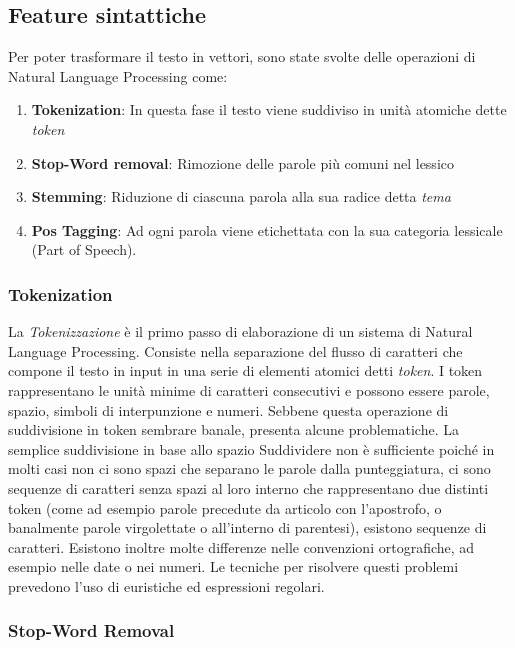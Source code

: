 \subsection{Feature sintattiche}
Per poter trasformare il testo in vettori, sono state svolte delle operazioni di Natural Language Processing come:
\begin{enumerate}
\item \textbf{Tokenization}: In questa fase il testo viene suddiviso in unità atomiche dette \emph{token}
\item \textbf{Stop-Word removal}: Rimozione delle parole più comuni nel lessico
\item \textbf{Stemming}: Riduzione di ciascuna parola alla sua radice detta \emph{tema}
\item \textbf{Pos Tagging}: Ad ogni parola viene etichettata con la sua categoria lessicale (Part of Speech).
\end{enumerate}
\subsubsection{Tokenization}

La \emph{Tokenizzazione} è il primo passo di elaborazione di un sistema di Natural Language
Processing. Consiste nella separazione del flusso di caratteri che compone il testo
in input in una serie di elementi atomici detti \emph{token}. I token rappresentano le
unità minime di caratteri consecutivi e possono essere parole, spazio, simboli di
interpunzione e numeri. Sebbene questa operazione di suddivisione in token 
sembrare banale, presenta alcune problematiche. La semplice suddivisione in base allo spazio Suddividere non è sufficiente poiché in molti casi non
ci sono spazi che separano le parole dalla punteggiatura, ci sono sequenze di caratteri senza spazi al loro interno che rappresentano due distinti token (come ad esempio parole precedute da articolo con l'apostrofo, o banalmente parole virgolettate o all'interno di parentesi), esistono sequenze di caratteri. Esistono inoltre molte differenze nelle convenzioni ortografiche, ad esempio nelle date o nei numeri. 
Le tecniche per risolvere questi problemi prevedono l'uso di euristiche ed  espressioni regolari.
 
\subsubsection{Stop-Word Removal}

